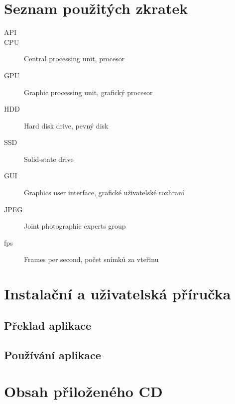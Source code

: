 \documentclass[11pt,twoside,a4paper]{book}
\begin{document}
\appendix


\chapter{Seznam použitých zkratek}

\begin{description}
\item[API]
\item[CPU] Central processing unit, procesor
\item[GPU] Graphic processing unit, grafický procesor
\item[HDD] Hard disk drive, pevný disk
\item[SSD] Solid-state drive
\item[GUI] Graphics user interface, grafické uživatelské rozhraní
\item[JPEG]  Joint photographic experts group
\item[fps]  Frames per second, počet snímků za vteřinu
\end{description}

\chapter{Instalační a uživatelská příručka}
\label{chap:install}

\section{Překlad aplikace}
\section{Používání aplikace}

\chapter{Obsah přiloženého CD}
\end{document}
